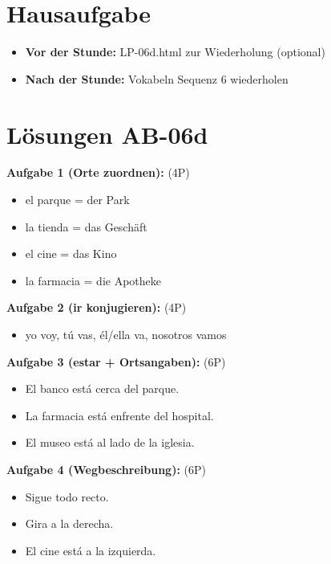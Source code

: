 \documentclass[11pt,a4paper]{article}
\begin{document}
\section{Hausaufgabe}

\begin{itemize}
    \item \textbf{Vor der Stunde:} LP-06d.html zur Wiederholung (optional)
    \item \textbf{Nach der Stunde:} Vokabeln Sequenz 6 wiederholen
\end{itemize}

\section{Lösungen AB-06d}

\textbf{Aufgabe 1 (Orte zuordnen):} (4P)
\begin{itemize}
    \item el parque = der Park
    \item la tienda = das Geschäft
    \item el cine = das Kino
    \item la farmacia = die Apotheke
\end{itemize}

\textbf{Aufgabe 2 (ir konjugieren):} (4P)
\begin{itemize}
    \item yo voy, tú vas, él/ella va, nosotros vamos
\end{itemize}

\textbf{Aufgabe 3 (estar + Ortsangaben):} (6P)
\begin{itemize}
    \item El banco está cerca del parque.
    \item La farmacia está enfrente del hospital.
    \item El museo está al lado de la iglesia.
\end{itemize}

\textbf{Aufgabe 4 (Wegbeschreibung):} (6P)
\begin{itemize}
    \item Sigue todo recto.
    \item Gira a la derecha.
    \item El cine está a la izquierda.
\end{itemize}
\end{document}

